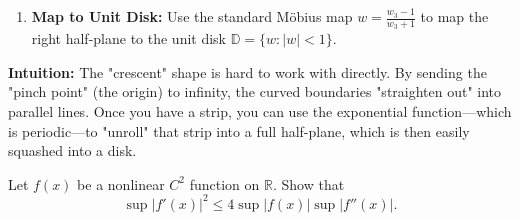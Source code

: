 \begin{solution}
\begin{enumerate}
    \item \textbf{Map to Unit Disk:} Use the standard M\"obius map $w = \frac{w_3 - 1}{w_3 + 1}$ to map the right half-plane to the unit disk $\mathbb{D} = \{w : |w| < 1\}$.
\end{enumerate}

\bigskip

\textbf{Intuition:} 
The "crescent" shape is hard to work with directly. By sending the "pinch point" (the origin) to infinity, the curved boundaries "straighten out" into parallel lines. Once you have a strip, you can use the exponential function—which is periodic—to "unroll" that strip into a full half-plane, which is then easily squashed into a disk.
\end{solution}

\begin{exercise}
\label{analysis:2012:3}
Let $f(x)$ be a nonlinear $C^2$ function on $\mathbb{R}$. Show that
\[
\sup|f'(x)|^2 \leq 4\sup|f(x)|\sup|f''(x)|.
\]
\end{exercise}

